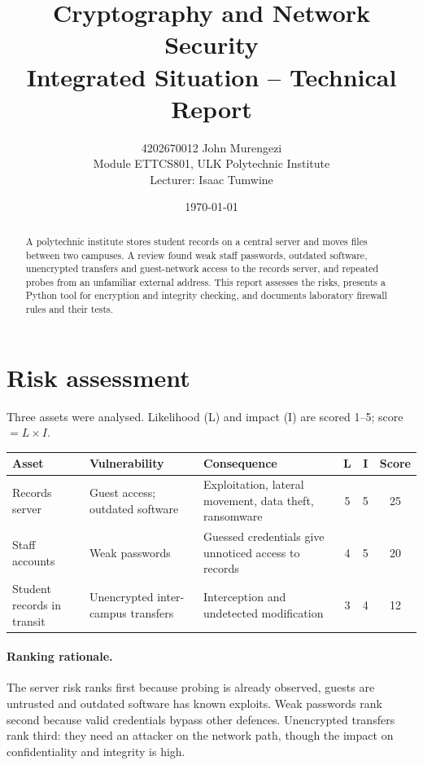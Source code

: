 \documentclass[11pt,a4paper]{article}
\title{Cryptography and Network Security\\ Integrated Situation -- Technical Report}
\author{4202670012 John Murengezi\\ Module ETTCS801, ULK Polytechnic Institute\\ Lecturer: Isaac Tumwine}
\date{\today}
\begin{document}
\maketitle

\begin{abstract}
A polytechnic institute stores student records on a central server and moves files between two campuses. A review found weak staff passwords, outdated software, unencrypted transfers and guest-network access to the records server, and repeated probes from an unfamiliar external address. This report assesses the risks, presents a Python tool for encryption and integrity checking, and documents laboratory firewall rules and their tests.
\end{abstract}

\section{Risk assessment}
Three assets were analysed. Likelihood (L) and impact (I) are scored 1--5; score $= L \times I$.

\begin{table}[h!]
\small
\centering
\begin{tabularx}{\textwidth}{@{}l X X c c c@{}}
\toprule
Asset & Vulnerability & Consequence & L & I & Score \\
\midrule
Records server & Guest access; outdated software & Exploitation, lateral movement, data theft, ransomware & 5 & 5 & 25 \\
Staff accounts & Weak passwords & Guessed credentials give unnoticed access to records & 4 & 5 & 20 \\
Student records in transit & Unencrypted inter-campus transfers & Interception and undetected modification & 3 & 4 & 12 \\
\bottomrule
\end{tabularx}
\end{table}

\paragraph{Ranking rationale.} The server risk ranks first because probing is already observed, guests are untrusted and outdated software has known exploits. Weak passwords rank second because valid credentials bypass other defences. Unencrypted transfers rank third: they need an attacker on the network path, though the impact on confidentiality and integrity is high.
\end{document}
